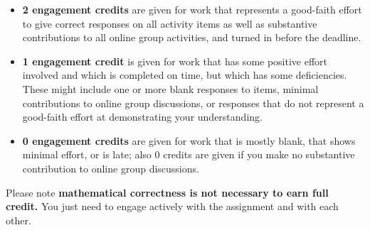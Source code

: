 \documentclass[11pt]{article}
\begin{document}
\begin{itemize}
    \item \textbf{2 engagement credits} are given for work that represents a good-faith effort to give correct responses on all activity items as well as substantive contributions to all online group activities, and turned in before the deadline. 
    \item \textbf{1 engagement credit} is given for work that has some positive effort involved and which is completed on time, but which has some deficiencies. These might include one or more blank responses to items, minimal contributions to online group discussions, or responses that do not represent a good-faith effort at demonstrating your understanding. 
    \item \textbf{0 engagement credits} are given for work that is mostly blank, that shows minimal effort, or is late; also 0 credits are given if you make no substantive contribution to online group discussions. 
\end{itemize}

Please note \textbf{mathematical correctness is not necessary to earn full credit.} You just need to engage actively with the assignment and with each other. 
\end{document}
